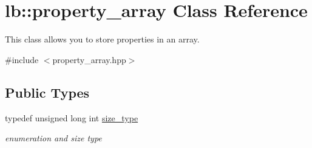 \hypertarget{classlb_1_1property__array}{\section{lb\-:\-:property\-\_\-array \-Class \-Reference}
\label{classlb_1_1property__array}
}


\-This class allows you to store properties in an array.  




{\ttfamily \#include $<$property\-\_\-array.\-hpp$>$}

\subsection*{\-Public \-Types}
\begin{DoxyCompactItemize}
\item 
\hypertarget{classlb_1_1property__array_a76d861a6fb4b99128f627ad951918429}{typedef unsigned long int \hyperlink{classlb_1_1property__array_a76d861a6fb4b99128f627ad951918429}{size\-\_\-type}}\label{classlb_1_1property__array_a76d861a6fb4b99128f627ad951918429}

\begin{DoxyCompactList}\small\item\em enumeration and size type \end{DoxyCompactList}\end{DoxyCompactItemize}
